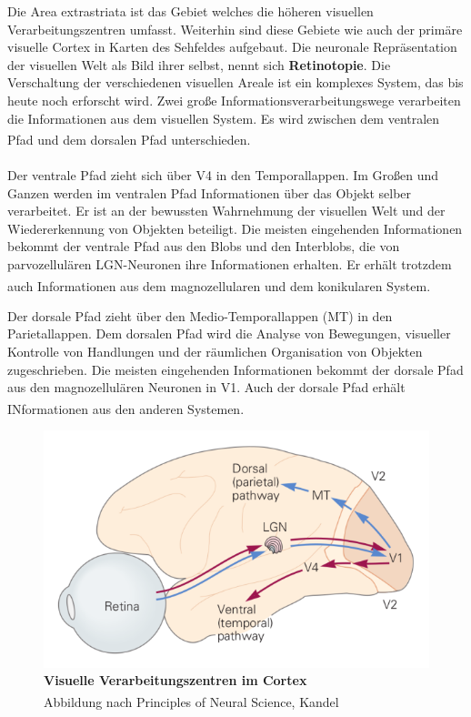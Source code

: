 \documentclass[12pt,a4paper,pdftex]{article}
\begin{document}
Die Area extrastriata ist das Gebiet welches die höheren visuellen Verarbeitungszentren umfasst. Weiterhin sind diese Gebiete wie auch der primäre visuelle Cortex in Karten des Sehfeldes aufgebaut. Die neuronale Repräsentation der visuellen Welt als Bild ihrer selbst, nennt sich \textbf{Retinotopie}.  Die Verschaltung der verschiedenen visuellen Areale ist ein komplexes System, das bis heute noch erforscht wird. Zwei große Informationsverarbeitungswege verarbeiten die Informationen aus dem visuellen System. Es wird zwischen dem ventralen Pfad und dem dorsalen Pfad unterschieden. \textsuperscript{\cite[25]{kandel2013principles}}
\\
\\ \noindent Der ventrale Pfad zieht sich über V4 in den Temporallappen. Im Großen und Ganzen werden im ventralen Pfad Informationen über das Objekt selber verarbeitet. Er ist an der bewussten Wahrnehmung der visuellen Welt und der Wiedererkennung von Objekten beteiligt. Die meisten eingehenden Informationen bekommt der ventrale Pfad aus den Blobs und den Interblobs, die von parvozellulären LGN-Neuronen ihre Informationen erhalten. Er erhält trotzdem auch Informationen aus dem magnozellularen und dem konikularen System. \textsuperscript{\cite[10]{neurowissenschaften_baer}}



Der dorsale Pfad zieht über den Medio-Temporallappen (MT) in den Parietallappen. Dem dorsalen Pfad wird die Analyse von Bewegungen, visueller Kontrolle von Handlungen  
und der räumlichen Organisation von Objekten zugeschrieben. Die meisten eingehenden Informationen bekommt der dorsale Pfad aus den magnozellulären Neuronen in V1. Auch der dorsale Pfad erhält INformationen aus den anderen Systemen. \textsuperscript{\cite[10]{neurowissenschaften_baer}}

\begin{figure}[H]
    \centering
    \includegraphics{pictures/visual/visual_Cortex.png}
    \caption[Visuelle Verarbeitungszentren im Cortex]{\textbf{Visuelle Verarbeitungszentren im Cortex}\\
    Abbildung nach Principles of Neural Science, Kandel \textsuperscript{\cite[27]{kandel2013principles}}}
    \label{fig:visual_pathway_cortex}
\end{figure}
\end{document}
